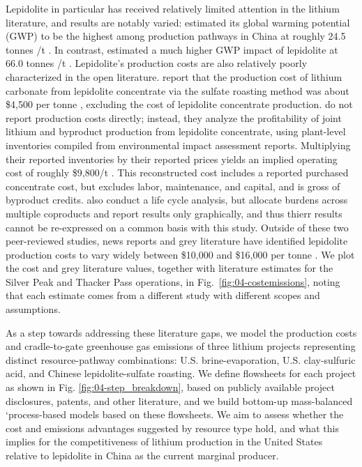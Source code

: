 \documentclass{article}
\renewcommand\_{\textunderscore\allowbreak}
\begin{document}
Lepidolite in particular has received relatively limited attention in the lithium literature, and results are notably varied: \citet{liuCarbonFootprintBatteryGrade2025} estimated its global warming potential (GWP) to be the highest among production pathways in China at roughly 24.5 tonnes /t . In contrast, \citet{wangLifeCycleEnvironmental2026} estimated a much higher GWP impact of lepidolite at 66.0 tonnes /t . Lepidolite's production costs are also relatively poorly characterized in the open literature.  \citet{gaoLithiumExtractionHard2023} report that the production cost of lithium carbonate from lepidolite concentrate via the sulfate roasting method was about \$4,500 per tonne , excluding the cost of lepidolite concentrate production. \citet{tianIntegratedEnvironmentalEconomic2026} do not report production costs directly; instead, they analyze the profitability of joint lithium and byproduct production from lepidolite concentrate, using plant-level inventories compiled from environmental impact assessment reports. Multiplying their reported inventories by their reported prices yields an implied operating cost of roughly \$9,800/t . This reconstructed cost includes a reported purchased concentrate cost, but excludes labor, maintenance, and capital, and is gross of byproduct credits. \citet{tianIntegratedEnvironmentalEconomic2026} also conduct a life cycle analysis, but allocate burdens across multiple coproducts and report results only graphically, and thus thierr results cannot be re-expressed on a common basis with this study. Outside of these two peer-reviewed studies, news reports and grey literature have identified lepidolite production costs to vary widely between \$10,000 and \$16,000 per tonne \cite{atkinsonLithiumPriceReversion2023, liuChinaLithiumBoom2024, jamasmieCATLCutLithium2024}. We plot the \citet{tianIntegratedEnvironmentalEconomic2026} cost and grey literature values, together with literature estimates for the Silver Peak and Thacker Pass operations, in Fig.~\ref{fig:04-costemissions}, noting that each estimate comes from a different study with different scopes and assumptions.

As a step towards addressing these literature gaps, we model the production costs and cradle-to-gate greenhouse gas emissions of three lithium projects representing distinct resource-pathway combinations: U.S. brine-evaporation, U.S. clay-sulfuric acid, and Chinese lepidolite-sulfate roasting. We define flowsheets for each project as shown in Fig. \ref{fig:04-step_breakdown}, based on publicly available project disclosures, patents, and other literature, and we build bottom-up mass-balanced `process-based models based on these flowsheets. We aim to assess whether the cost and emissions advantages suggested by resource type hold, and what this implies for the competitiveness of lithium production in the United States relative to lepidolite in China as the current marginal producer. 
\end{document}
